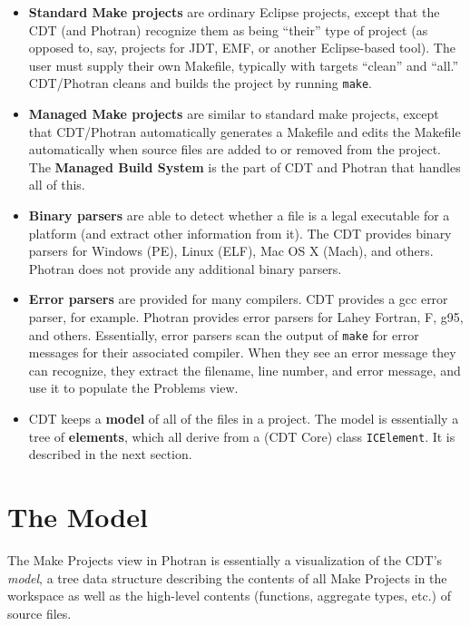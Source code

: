 \begin{itemize}

\item \textbf{Standard Make projects} are ordinary Eclipse projects, except that
the CDT (and Photran) recognize them as being ``their'' type of project
(as opposed to, say, projects for JDT, EMF, or another Eclipse-based tool).
The user must supply their own Makefile, typically with targets ``clean''
and ``all.''  CDT/Photran cleans and builds the project by running
\texttt{make}.

\item \textbf{Managed Make projects} are similar to standard make projects,
except that CDT/Photran automatically generates a Makefile and edits
the Makefile automatically when source files are added to or removed
from the project.  The \textbf{Managed Build System} is the part of
CDT and Photran that handles all of this.

\item \textbf{Binary parsers} are able to detect whether a file is a legal
executable for a platform (and extract other information from it).
The CDT provides binary parsers for
Windows (PE), Linux (ELF), Mac OS X (Mach), and others.  Photran
does not provide any additional binary parsers.

\item \textbf{Error parsers} are provided for many compilers.  CDT provides
a gcc error parser, for example.  Photran provides error parsers for
Lahey Fortran, F, g95, and others.  Essentially, error parsers scan the
output of \texttt{make} for error messages for their associated compiler.
When they see an error message they can recognize, they extract the
filename, line number, and error message, and use it to populate the
Problems view.

\item CDT keeps a \textbf{model} of all of the files in a project.
The model is essentially a tree of \textbf{elements}, which all
derive from a (CDT Core) class \texttt{ICElement}.  It is described
in the next section.

\end{itemize}

\section{The Model}

The Make Projects view in Photran is essentially a visualization of
the CDT's \textit{model}, a tree data structure describing the contents
of all Make Projects in the workspace as well as the high-level contents
(functions, aggregate types, etc.) of source files.

